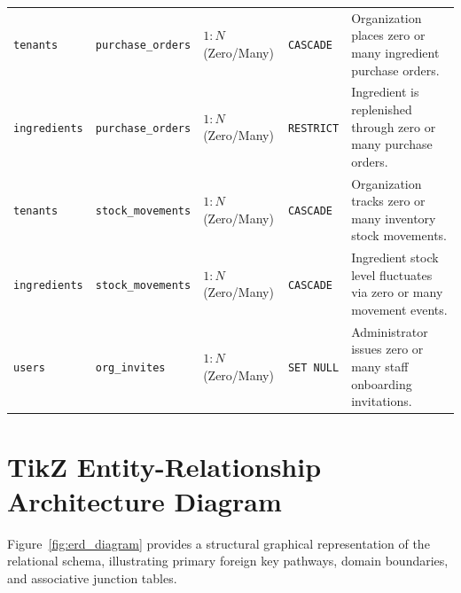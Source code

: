 \begin{xltabular}{\textwidth}{llllX}
\texttt{tenants} & \texttt{purchase\_orders} & $1 : N$ (Zero/Many) & \texttt{CASCADE} & Organization places zero or many ingredient purchase orders. \\
\texttt{ingredients} & \texttt{purchase\_orders} & $1 : N$ (Zero/Many) & \texttt{RESTRICT} & Ingredient is replenished through zero or many purchase orders. \\
\texttt{tenants} & \texttt{stock\_movements} & $1 : N$ (Zero/Many) & \texttt{CASCADE} & Organization tracks zero or many inventory stock movements. \\
\texttt{ingredients} & \texttt{stock\_movements} & $1 : N$ (Zero/Many) & \texttt{CASCADE} & Ingredient stock level fluctuates via zero or many movement events. \\
\texttt{users} & \texttt{org\_invites} & $1 : N$ (Zero/Many) & \texttt{SET NULL} & Administrator issues zero or many staff onboarding invitations. \\
\end{xltabular}
\normalsize

\section{TikZ Entity-Relationship Architecture Diagram}
\label{sec:erd_tikz}
Figure~\ref{fig:erd_diagram} provides a structural graphical representation of the relational schema, illustrating primary foreign key pathways, domain boundaries, and associative junction tables.

